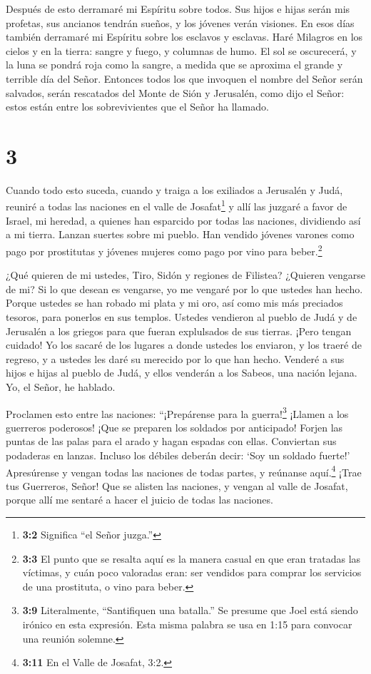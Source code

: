  Después de esto derramaré mi Espíritu sobre todos. Sus
hijos e hijas serán mis profetas, sus ancianos tendrán sueños, y los
jóvenes verán visiones.  En esos días también derramaré mi
Espíritu sobre los esclavos y esclavas.  Haré Milagros en
los cielos y en la tierra: sangre y fuego, y columnas de humo.
 El sol se oscurecerá, y la luna se pondrá roja como la
sangre, a medida que se aproxima el grande y terrible día del Señor.
 Entonces todos los que invoquen el nombre del Señor serán
salvados, serán rescatados del Monte de Sión y Jerusalén, como dijo el
Señor: estos están entre los sobrevivientes que el Señor ha llamado.

\hypertarget{section-2}{%
\section{3}\label{section-2}}

 Cuando todo esto suceda, cuando y traiga a los exiliados a
Jerusalén y Judá,  reuniré a todas las naciones en el valle
de Josafat\footnote{\textbf{3:2} Significa ``el Señor juzga.''} y allí
las juzgaré a favor de Israel, mi heredad, a quienes han esparcido por
todas las naciones, dividiendo así a mi tierra.  Lanzan
suertes sobre mi pueblo. Han vendido jóvenes varones como pago por
prostitutas y jóvenes mujeres como pago por vino para beber.\footnote{\textbf{3:3}
  El punto que se resalta aquí es la manera casual en que eran tratadas
  las víctimas, y cuán poco valoradas eran: ser vendidos para comprar
  los servicios de una prostituta, o vino para beber.}

 ¿Qué quieren de mi ustedes, Tiro, Sidón y regiones de
Filistea? ¿Quieren vengarse de mi? Si lo que desean es vengarse, yo me
vengaré por lo que ustedes han hecho.  Porque ustedes se han
robado mi plata y mi oro, así como mis más preciados tesoros, para
ponerlos en sus templos.  Ustedes vendieron al pueblo de
Judá y de Jerusalén a los griegos para que fueran explulsados de sus
tierras.  ¡Pero tengan cuidado! Yo los sacaré de los lugares
a donde ustedes los enviaron, y los traeré de regreso, y a ustedes les
daré su merecido por lo que han hecho.  Venderé a sus hijos
e hijas al pueblo de Judá, y ellos venderán a los Sabeos, una nación
lejana. Yo, el Señor, he hablado.

 Proclamen esto entre las naciones: ``¡Prepárense para la
guerra!\footnote{\textbf{3:9} Literalmente, ``Santifiquen una batalla.''
  Se presume que Joel está siendo irónico en esta expresión. Esta misma
  palabra se usa en 1:15 para convocar una reunión solemne.} ¡Llamen a
los guerreros poderosos! ¡Que se preparen los soldados por anticipado!
 Forjen las puntas de las palas para el arado y hagan
espadas con ellas. Conviertan sus podaderas en lanzas. Incluso los
débiles deberán decir: `Soy un soldado fuerte!' 
Apresúrense y vengan todas las naciones de todas partes, y reúnanse
aquí.\footnote{\textbf{3:11} En el Valle de Josafat, 3:2.} ¡Trae tus
Guerreros, Señor!  Que se alisten las naciones, y vengan al
valle de Josafat, porque allí me sentaré a hacer el juicio de todas las
naciones.

